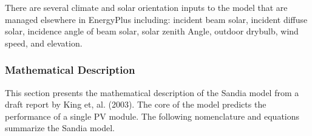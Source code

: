 There are several climate and solar orientation inputs to the model that are managed elsewhere in EnergyPlus including: incident beam solar, incident diffuse solar, incidence angle of beam solar, solar zenith Angle, outdoor drybulb, wind speed, and elevation.

\subsubsection{Mathematical Description}\label{mathematical-description-2}

This section presents the mathematical description of the Sandia model from a draft report by King et, al. (2003). The core of the model predicts the performance of a single PV module. The following nomenclature and equations summarize the Sandia model.

